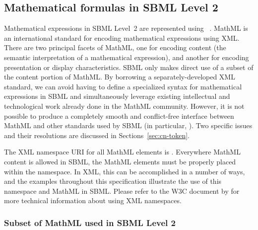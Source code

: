 \subsection{Mathematical formulas in SBML Level 2}
\label{sec:formulas}

Mathematical expressions in SBML Level~2 are represented using
\mathmltwo~\citep{w3c:2000b}.  MathML is an international standard
for encoding mathematical expressions using XML.  There are two
principal facets of MathML, one for encoding content (\ie the
semantic interpretation of a mathematical expression), and another
for encoding presentation or display characteristics.  SBML only
makes direct use of a subset of the content portion of MathML.  By
borrowing a separately-developed XML standard, we can avoid having
to define a specialized syntax for mathematical expressions in
SBML and simultaneously leverage existing intellectual and
technological work already done in the MathML community.  However,
it is not possible to produce a completely smooth and
conflict-free interface between MathML and other standards used by
SBML (in particular, \xmlschema).  Two specific issues and their
resolutions are discussed in Sections~\ref{sec:cn-token}.

The XML namespace URI for all MathML elements is
.  Everywhere MathML
content is allowed in SBML, the MathML elements must be properly
placed within the \mathmltwo namespace.  In XML, this can be
accomplished in a number of ways, and the examples throughout this
specification illustrate the use of this namespace and MathML in
SBML.  Please refer to the W3C document by \citet{bray:1999} for
more technical information about using XML namespaces.


\subsubsection{Subset of MathML used in SBML Level 2}
\label{sec:mathmlsubset}

